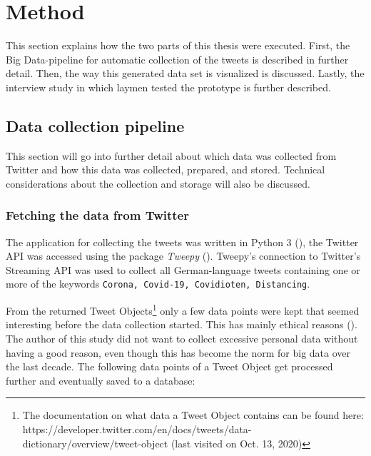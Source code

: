 \section{Method}
This section explains how the two parts of this thesis were executed. First, the Big Data-pipeline for automatic collection of the tweets is described in further detail. Then, the way this generated data set is visualized is discussed. Lastly, the interview study in which laymen tested the prototype is further described.

\subsection{Data collection pipeline}
This section will go into further detail about which data was collected from Twitter and how this data was collected, prepared, and stored. Technical considerations about the collection and storage will also be discussed.

\subsubsection{Fetching the data from Twitter} \label{sec:fetchedData}
The application for collecting the tweets was written in Python 3 (\cite{10.5555/1593511}), the Twitter API was accessed using the package \emph{Tweepy} (\cite{roesslein2020tweepy}). Tweepy's connection to Twitter's Streaming API was used to collect all German-language tweets containing one or more of the keywords \verb+Corona, Covid-19, Covidioten, Distancing+.

From the returned Tweet Objects\footnote{The documentation on what data a Tweet Object contains can be found here: https://developer.twitter.com/en/docs/tweets/data-dictionary/overview/tweet-object (last visited on Oct. 13, 2020)} only a few data points were kept that seemed interesting before the data collection started. This has mainly ethical reasons (\cite{richards2014big}). The author of this study did not want to collect excessive personal data without having a good reason, even though this has become the norm for big data over the last decade. The following data points of a Tweet Object get processed further and eventually saved to a database:

